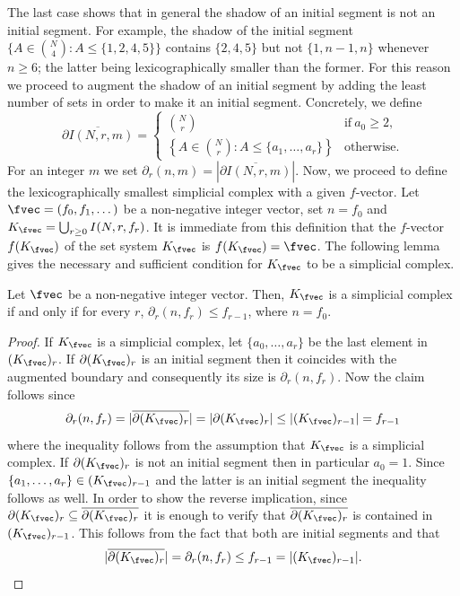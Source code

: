 The last case shows that in general the shadow of an initial segment is not an initial segment.
For example, the shadow of the initial segment $\{A\in \binom{N}{4}\colon A \leq \{1,2,4,5\}\}$ contains $\{2,4,5\}$
but not $\{1,n-1,n\}$ whenever $n\geq 6$; the latter being lexicographically smaller than the former.
For this reason we proceed to augment the shadow of an initial segment by adding the least number of sets in order to make it an initial segment.
Concretely, we define
$$\overline{\partial I(N,r,m)} = 
\begin{cases} 
    \binom{N}{r} & \text{if}~a_0\geq 2, \\
    \left \{A \in \binom{N}{r} \colon A \leq \{a_1,\dots, a_r\} \right \} &  \text{otherwise.}
\end{cases}$$
For an integer $m$ we set $\partial_r(n,m) = |\overline{\partial I(N,r,m)}|$.
%
Now, we proceed to define the lexicographically smallest simplicial complex with a given $f$-vector.
Let $\fvec = (f_0,f_1,\dots)$ be a non-negative integer vector, set $n=f_0$ and $K_{\fvec} = \bigcup_{r\geq 0}I(N,r,f_r)$.
It is immediate from this definition that the $f$-vector $f(K_{\fvec})$ of the set system $K_{\fvec}$ is $f(K_{\fvec}) = \fvec$.
The following lemma gives the necessary and sufficient condition for $K_{\fvec}$ to be a simplicial complex.
\begin{lemma}
    Let $\fvec$ be a non-negative integer vector. Then, $K_{\fvec}$ is a simplicial complex if and only if for every $r$, $\partial_r(n,f_r) \leq f_{r-1}$, where $n=f_0$.    
  \end{lemma}
\begin{proof}
  If $K_{\fvec}$ is a simplicial complex, let $\{a_0,\dots, a_r\}$ be the last element in  $(K_{\fvec})_r$.   
  If $\partial (K_{\fvec})_r$ is an initial segment then it coincides with the augmented boundary and consequently its size is $\partial_r(n,f_r)$.
  Now the claim follows since $$\partial_r(n,f_r) = |\overline{\partial (K_{\fvec})_r}| = |\partial (K_{\fvec})_r|\leq |(K_{\fvec})_{r-1}| = f_{r-1}$$
  where the inequality follows from the assumption that $K_{\fvec}$ is a simplicial complex.
  If $\partial (K_{\fvec})_r$ is not an initial segment then in particular $a_0=1$. Since $\{a_1,\dots,a_r\} \in (K_{\fvec})_{r-1}$ and the latter is an initial segment the inequality follows as well.
%
    In order to show the reverse implication, since $\partial (K_{\fvec})_r \subseteq \overline{\partial (K_{\fvec})_r}$ it is enough to verify that $\overline{\partial (K_{\fvec})_r}$ is contained in $(K_{\fvec})_{r-1}$. This follows from the fact that both are initial segments and that $$|\overline{\partial (K_{\fvec})_r}| = \partial_r (n,f_r) \leq f_{r-1} = |(K_{\fvec})_{r-1}|.$$
  \end{proof}
